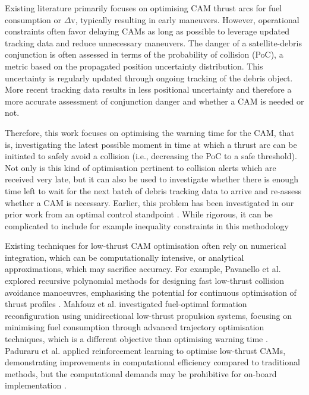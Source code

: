 \documentclass[letterpaper, preprint, paper,11pt]{AAS}	%
\begin{document}
Existing literature primarily focuses on optimising CAM thrust arcs for fuel consumption or $\Delta$v, typically resulting in early maneuvers. However, operational constraints often favor delaying CAMs as long as possible to leverage updated tracking data and reduce unnecessary maneuvers. The danger of a satellite-debris conjunction is often assessed in terms of the probability of collision (PoC), a metric based on the propagated position uncertainty distribution. This uncertainty is regularly updated through ongoing tracking of the debris object. More recent tracking data results in less positional uncertainty and therefore a more accurate assessment of conjunction danger and whether a CAM is needed or not. 

Therefore, this work focuses on optimising the warning time for the CAM, that is, investigating the latest possible moment in time at which a thrust arc can be initiated to safely avoid a collision (i.e., decreasing the PoC to a safe threshold). Not only is this kind of optimisation pertinent to collision alerts which are received very late, but it can also be used to investigate whether there is enough time left to wait for the next batch of debris tracking data to arrive and re-assess whether a CAM is necessary. Earlier, this problem has been investigated in our prior work from an optimal control standpoint \cite{dell2024characterization}. While rigorous, it can be complicated to include for example inequality constraints in this methodology

Existing techniques for low-thrust CAM optimisation often rely on numerical integration, which can be computationally intensive, or analytical approximations, which may sacrifice accuracy. For example, Pavanello et al. explored recursive polynomial methods for designing fast low-thrust collision avoidance manoeuvres, emphasising the potential for continuous optimisation of thrust profiles \cite{pavanello2024}. Mahfouz et al. investigated fuel-optimal formation reconfiguration using unidirectional low-thrust propulsion systems, focusing on minimising fuel consumption through advanced trajectory optimisation techniques, which is a different objective than optimising warning time \cite{Mahfouz2025}. Paduraru et al. applied reinforcement learning to optimise low-thrust CAMs, demonstrating improvements in computational efficiency compared to traditional methods, but the computational demands may be prohibitive for on-board implementation \cite{paduraru2024}.
\end{document}

